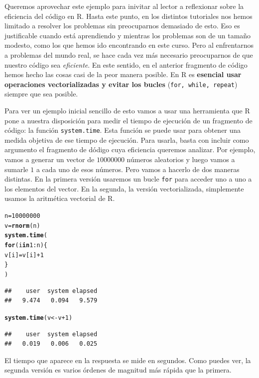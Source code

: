 \documentclass[10pt,a4paper]{article}\usepackage[]{graphicx}\usepackage[]{color}
\makeatletter
\newcommand{\hlnum}[1]{\textcolor[rgb]{0.686,0.059,0.569}{#1}}%
\newcommand{\hlopt}[1]{\textcolor[rgb]{0,0,0}{#1}}%
\newcommand{\hlstd}[1]{\textcolor[rgb]{0.345,0.345,0.345}{#1}}%
\newcommand{\hlkwa}[1]{\textcolor[rgb]{0.161,0.373,0.58}{\textbf{#1}}}%
\newcommand{\hlkwb}[1]{\textcolor[rgb]{0.69,0.353,0.396}{#1}}%
\newcommand{\hlkwd}[1]{\textcolor[rgb]{0.737,0.353,0.396}{\textbf{#1}}}%
\newenvironment{kframe}{%
 \def\at@end@of@kframe{}%
 \ifinner\ifhmode%
  \def\at@end@of@kframe{\end{minipage}}%
  \begin{minipage}{\columnwidth}%
 \fi\fi%
 \def\FrameCommand##1{\hskip\@totalleftmargin \hskip-\fboxsep
 \colorbox{shadecolor}{##1}\hskip-\fboxsep
     \hskip-\linewidth \hskip-\@totalleftmargin \hskip\columnwidth}%
 \MakeFramed {\advance\hsize-\width
   \@totalleftmargin\z@ \linewidth\hsize
   \@setminipage}}%
 {\par\unskip\endMakeFramed%
 \at@end@of@kframe}
\newenvironment{knitrout}{}{} %
\newcounter {cont01}
\makeatother
\begin{document}
Queremos aprovechar este ejemplo para inivitar al lector a reflexionar sobre la eficiencia del código en R. Hasta este punto, en los distintos tutoriales nos hemos limitado a resolver los problemas sin preocuparnos demasiado de esto. Eso es justificable cuando está aprendiendo y mientras los problemas son de un tamaño modesto, como los que hemos ido encontrando en este curso. Pero al enfrentarnos a problemas del mundo real, se hace cada vez más necesario preocuparnos de que nuestro código sea {\em eficiente}. En este sentido, en el anterior fragmento de código hemos hecho las cosas casi de la peor manera posible. En R es {\bf esencial usar operaciones vectorializadas y evitar los bucles} ({\tt for, while, repeat}) siempre que sea posible.

Para ver un ejemplo inicial sencillo de esto vamos a usar una herramienta que R pone a nuestra disposición para medir el tiempo de ejecución de un fragmento de código: la función {\tt system.time}. Esta función se puede usar para obtener una medida objetiva de ese tiempo de ejecución. Para usarla, basta con incluir como argumento el fragmento de dódigo cuya eficiencia queremos analizar. Por ejemplo, vamos a generar un vector de $10000000$ números aleatorios y luego vamos a sumarle $1$ a cada uno de esos números. Pero vamos a hacerlo de dos maneras distintas. En la primera versión usaremos un bucle {\tt for} para acceder uno a uno a los elementos del vector. En la segunda, la versión vectorializada, simplemente usamos la aritmética vectorial de R.
\begin{knitrout}
\color{fgcolor}\begin{kframe}
\begin{alltt}
\hlstd{n} \hlkwb{=} \hlnum{10000000}
\hlstd{v} \hlkwb{=} \hlkwd{rnorm}\hlstd{(n)}
\hlkwd{system.time}\hlstd{(}
  \hlkwa{for} \hlstd{(i} \hlkwa{in} \hlnum{1}\hlopt{:}\hlstd{n)\{}
    \hlstd{v[i]} \hlkwb{=} \hlstd{v[i]} \hlopt{+} \hlnum{1}
  \hlstd{\}}
\hlstd{)}
\end{alltt}
\begin{verbatim}
##    user  system elapsed 
##   9.474   0.094   9.579
\end{verbatim}
\begin{alltt}
\hlkwd{system.time}\hlstd{(v} \hlkwb{<-} \hlstd{v} \hlopt{+}\hlnum{1}\hlstd{)}
\end{alltt}
\begin{verbatim}
##    user  system elapsed 
##   0.019   0.006   0.025
\end{verbatim}
\end{kframe}
\end{knitrout}
El tiempo que aparece en la respuesta se mide en segundos. Como puedes ver, la segunda versión es varios órdenes de magnitud más rápida que la primera.
\end{document}
